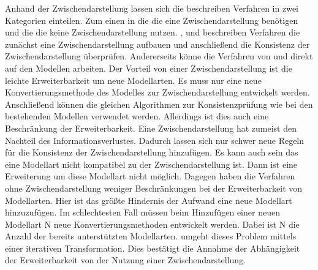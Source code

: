 Anhand der Zwischendarstellung lassen sich die beschreiben Verfahren in zwei Kategorien einteilen.
Zum einen in die die eine Zwischendarstellung benötigen und die die keine Zwischendarstellung nutzen.
\cite{Rasch2003}, \cite{Shinkawa2006} und \cite{Mens2005} beschreiben Verfahren die zunächst eine Zwischendarstellung aufbauen und anschließend die Konsistenz der Zwischendarstellung überprüfen.
Andererseits könne die Verfahren von \cite{Egyed2001} und \cite{Egyed2006} direkt auf den Modellen arbeiten.
Der Vorteil von einer Zwischendarstellung ist die leichte Erweiterbarkeit um neue Modellarten.
Es muss nur eine neue Konvertierungsmethode des Modelles zur Zwischendarstellung entwickelt werden.
Anschließend können die gleichen Algorithmen zur Konsistenzprüfung wie bei den bestehenden Modellen verwendet werden.
Allerdings ist dies auch eine Beschränkung der Erweiterbarkeit.
Eine Zwischendarstellung hat zumeist den Nachteil des Informationsverlustes.
Dadurch lassen sich nur schwer neue Regeln für die Konsistenz der Zwischendarstellung hinzufügen.
Es kann auch sein das eine Modellart nicht kompatibel zu der Zwischendarstellung ist.
Dann ist eine Erweiterung um diese Modellart nicht möglich.
Dagegen haben die Verfahren ohne Zwischendarstellung weniger Beschränkungen bei der Erweiterbarkeit von Modellarten.
Hier ist das größte Hindernis der Aufwand eine neue Modellart hinzuzufügen.
Im schlechtesten Fall müssen beim Hinzufügen einer neuen Modellart N neue Konvertierungsmethoden entwickelt werden.
Dabei ist N die Anzahl der bereits unterstützten Modellarten.
\cite{Egyed2001} umgeht dieses Problem mittels einer iterativen Transformation.
Dies bestätigt die Annahme der Abhängigkeit der Erweiterbarkeit von der Nutzung einer Zwischendarstellung.

